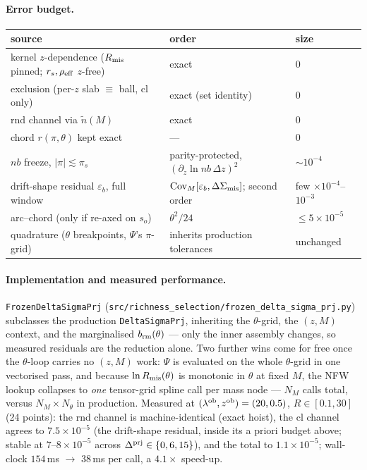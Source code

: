 \documentclass[a4paper, 11pt]{article}
\newcommand{\lob}{\lambda^{\rm ob}}
\newcommand{\zob}{z^{\rm ob}}
\newcommand{\dprj}{\Delta^{\rm prj}}
\newcommand{\brm}{b_{\rm rm}}
\newcommand{\pis}{\pi_s}
\newcommand{\DSmis}{\Delta\Sigma_{\rm mis}}
\newcommand{\Rmis}{R_{\rm mis}}
\begin{document}
\paragraph{Error budget.}
\begin{center}
\small
\begin{tabular}{l l l}
\toprule
source & order & size \\
\midrule
kernel $z$-dependence ($\Rmis$ pinned; $r_s,\rho_{\rm eff}$
$z$-free) & exact & $0$ \\
exclusion (per-$z$ slab $\equiv$ ball, cl only) & exact (set
identity) & $0$ \\
rnd channel via $\tilde n(M)$ & exact & $0$ \\
chord $r(\pi,\theta)$ kept exact & --- & $0$ \\
$nb$ freeze, $|\pi|\lesssim\pis$ & parity-protected,
$(\partial_z\ln nb\,\Delta z)^2$ & $\sim10^{-4}$ \\
drift-shape residual $\varepsilon_b$, full window &
${\rm Cov}_M[\varepsilon_b,\DSmis]$; second order & few
$\times10^{-4}$--$10^{-3}$ \\
arc--chord (only if re-axed on $s_o$) & $\theta^2/24$ &
$\le5\times10^{-5}$ \\
quadrature ($\theta$ breakpoints, $\Psi$'s $\pi$-grid) &
inherits production tolerances & unchanged \\
\bottomrule
\end{tabular}
\end{center}
\paragraph{Implementation and measured performance.}
\texttt{FrozenDeltaSigmaPrj}
(\texttt{src/richness\_selection/frozen\_delta\_sigma\_prj.py})
subclasses the production \texttt{DeltaSigmaPrj}, inheriting the
$\theta$-grid, the $(z,M)$ context, and the marginalised
$\brm(\theta)$ --- only the inner assembly changes, so measured
residuals are the reduction alone. Two further wins come for
free once the $\theta$-loop carries no $(z,M)$ work: $\Psi$ is
evaluated on the whole $\theta$-grid in one vectorised pass, and
because $\ln\Rmis(\theta)$ is monotonic in $\theta$ at fixed
$M$, the NFW lookup collapses to \emph{one} tensor-grid spline
call per mass node --- $N_M$ calls total, versus
$N_M\times N_\theta$ in production. Measured at
$(\lob,\zob)=(20,0.5)$, $R\in[0.1,30]$ (24 points): the rnd
channel is machine-identical (exact hoist), the cl channel
agrees to $7.5\times10^{-5}$ (the drift-shape residual, inside
its a priori budget above; stable at $7$--$8\times10^{-5}$
across $\dprj\in\{0,6,15\}$), and the total to
$1.1\times10^{-5}$; wall-clock $154\,$ms $\to$ $38\,$ms per
call, a $4.1\times$ speed-up.
\end{document}
